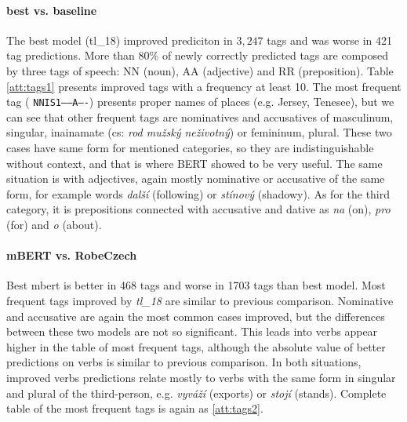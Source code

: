 \paragraph{best vs. baseline}
The best model (tl\_18) improved prediciton in $3,247$ tags and was worse in 421 tag predictions. More than 80\% of newly correctly predicted tags are composed by three tags of speech: NN (noun), AA (adjective) and RR (preposition). Table \ref{att:tags1} presents improved tags with a frequency at least 10. The most frequent tag ( \texttt{NNIS1-----A----}) presents proper names of places (e.g. Jersey, Tenesee), but we can see that other frequent tags are nominatives and accusatives of masculinum, singular,  inainamate (cs: \textit{rod mužský neživotný}) or femininum, plural. These two cases have same form for mentioned categories, so they are indistinguishable without context, and that is where BERT showed to be very useful. The same situation is with adjectives, again mostly nominative or accusative of the same form, for example words \textit{další} (following) or \textit{stínový} (shadowy). As for the third category, it is prepositions connected with accusative and dative as \textit{na} (on), \textit{pro} (for) and \textit{o} (about).


\paragraph{mBERT vs. RobeCzech}
Best mbert is better in 468 tags and worse in 1703 tags than best model. Most frequent tags improved by \textit{tl\_18} are similar to previous comparison. Nominative and accusative are again the most common cases improved, but the differences between these two models are not so significant. This leads into verbs appear higher in the table of most frequent tags, although the absolute value of better predictions on verbs is similar to previous comparison. In both situations, improved verbs predictions relate mostly to verbs with the same form in singular and plural of the third-person, e.g. \textit{vyváží} (exports) or \textit{stojí} (stands). Complete table of the most frequent tags is again as \ref{att:tags2}.

